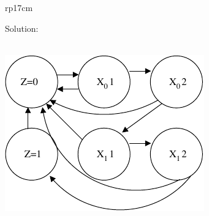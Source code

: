 \documentclass{article}
\begin{document}
\begin{longtable}[l]{rp{17cm}}
\begin{minipage}[t]{\linewidth}
Solution: \\ \\
\begin{center}
  \includegraphics{../StateMachines/Assessments/Wakerly_7_44_StateDiagram}
\end{center}
\end{minipage}\\
\medskip
\end{longtable}
\end{document}
